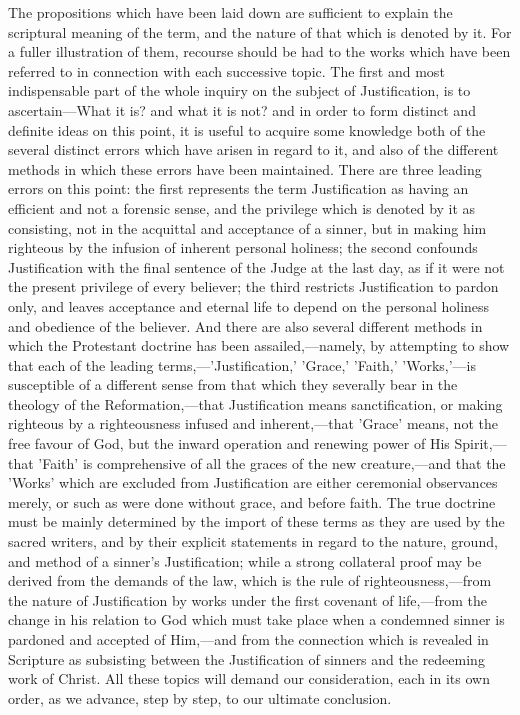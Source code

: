 \documentclass[
]{book}
\begin{document}
The propositions which have been laid down are sufficient to explain the scriptural meaning of the term, and the nature of that which is denoted by it. For a fuller illustration of them, recourse should be had to the works which have been referred to in connection with each successive topic. The first and most indispensable part of the whole inquiry on the subject of Justification, is to ascertain---What it is? and what it is not? and in order to form distinct and definite ideas on this point, it is useful to acquire some knowledge both of the several distinct errors which have arisen in regard to it, and also of the different methods in which these errors have been maintained. There are three leading errors on this point: the first represents the term Justification as having an efficient and not a forensic sense, and the privilege which is denoted by it as consisting, not in the acquittal and acceptance of a sinner, but in making him righteous by the infusion of inherent personal holiness; the second confounds Justification with the final sentence of the Judge at the last day, as if it were not the present privilege of every believer; the third restricts Justification to pardon only, and leaves acceptance and eternal life to depend on the personal holiness and obedience of the believer. And there are also several different methods in which the Protestant doctrine has been assailed,---namely, by attempting to show that each of the leading terms,---'Justification,' 'Grace,' 'Faith,' 'Works,'---is susceptible of a different sense from that which they severally bear in the theology of the Reformation,---that Justification means sanctification, or making righteous by a righteousness infused and inherent,---that 'Grace' means, not the free favour of God, but the inward operation and renewing power of His Spirit,---that 'Faith' is comprehensive of all the graces of the new creature,---and that the 'Works' which are excluded from Justification are either ceremonial observances merely, or such as were done without grace, and before faith. The true doctrine must be mainly determined by the import of these terms as they are used by the sacred writers, and by their explicit statements in regard to the nature, ground, and method of a sinner's Justification; while a strong collateral proof may be derived from the demands of the law, which is the rule of righteousness,---from the nature of Justification by works under the first covenant of life,---from the change in his relation to God which must take place when a condemned sinner is pardoned and accepted of Him,---and from the connection which is revealed in Scripture as subsisting between the Justification of sinners and the redeeming work of Christ. All these topics will demand our consideration, each in its own order, as we advance, step by step, to our ultimate conclusion.
\end{document}
